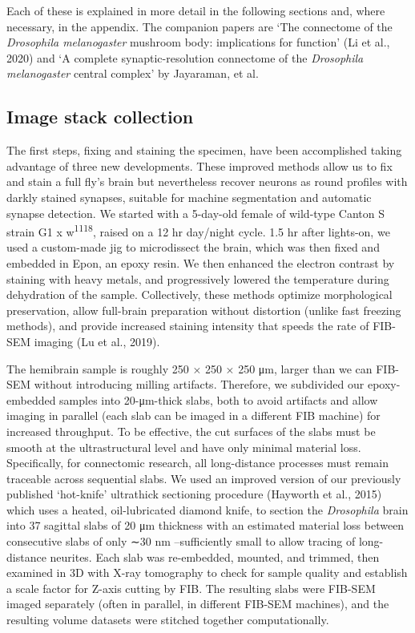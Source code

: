 \documentclass{article}
\begin{document}
Each of these is explained in more detail in the following sections and, where necessary, in the appendix. The companion papers are ‘The connectome of the \emph{Drosophila melanogaster} mushroom body: implications for function’ (Li et al., 2020) and ‘A complete synaptic-resolution connectome of the \emph{Drosophila melanogaster} central complex’ by Jayaraman, et al.

\subsection*{Image stack collection}

The first steps, fixing and staining the specimen, have been accomplished taking advantage of three new developments. These improved methods allow us to fix and stain a full fly’s brain but nevertheless recover neurons as round profiles with darkly stained synapses, suitable for machine segmentation and automatic synapse detection. We started with a 5-day-old female of wild-type Canton S strain G1 x w\textsuperscript{1118}, raised on a 12 hr day/night cycle. 1.5 hr after lights-on, we used a custom-made jig to microdissect the brain, which was then fixed and embedded in Epon, an epoxy resin. We then enhanced the electron contrast by staining with heavy metals, and progressively lowered the temperature during dehydration of the sample. Collectively, these methods optimize morphological preservation, allow full-brain preparation without distortion (unlike fast freezing methods), and provide increased staining intensity that speeds the rate of FIB-SEM imaging (Lu et al., 2019).

The hemibrain sample is roughly 250 × 250 × 250 μm, larger than we can FIB-SEM without introducing milling artifacts. Therefore, we subdivided our epoxy-embedded samples into 20-μm-thick slabs, both to avoid artifacts and allow imaging in parallel (each slab can be imaged in a different FIB machine) for increased throughput. To be effective, the cut surfaces of the slabs must be smooth at the ultrastructural level and have only minimal material loss. Specifically, for connectomic research, all long-distance processes must remain traceable across sequential slabs. We used an improved version of our previously published ‘hot-knife’ ultrathick sectioning procedure (Hayworth et al., 2015) which uses a heated, oil-lubricated diamond knife, to section the \emph{Drosophila} brain into 37 sagittal slabs of 20 μm thickness with an estimated material loss between consecutive slabs of only ∼30 nm –sufficiently small to allow tracing of long-distance neurites. Each slab was re-embedded, mounted, and trimmed, then examined in 3D with X-ray tomography to check for sample quality and establish a scale factor for Z-axis cutting by FIB. The resulting slabs were FIB-SEM imaged separately (often in parallel, in different FIB-SEM machines), and the resulting volume datasets were stitched together computationally.
\end{document}
